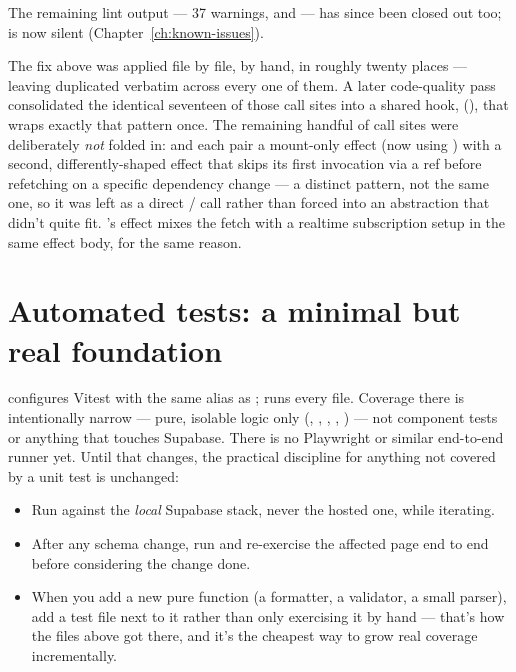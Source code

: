 \begin{olknote}
The remaining lint output — 37 warnings,  and  — has since been closed out too;  is now silent (Chapter~\ref{ch:known-issues}).
\end{olknote}

\begin{olknote}
The  fix above was applied file by file, by hand, in roughly twenty places — leaving  duplicated verbatim across every one of them. A later code-quality pass consolidated the identical seventeen of those call sites into a shared hook,  (), that wraps exactly that pattern once. The remaining handful of call sites were deliberately \emph{not} folded in:  and  each pair a mount-only effect (now using ) with a second, differently-shaped effect that skips its first invocation via a  ref before refetching on a specific dependency change — a distinct pattern, not the same one, so it was left as a direct / call rather than forced into an abstraction that didn't quite fit. 's effect mixes the fetch with a realtime subscription setup in the same effect body, for the same reason.
\end{olknote}

\section{Automated tests: a minimal but real foundation}

 configures Vitest with the same  alias as ;  runs every  file. Coverage there is intentionally narrow — pure, isolable logic only (, , , , ) — not component tests or anything that touches Supabase. There is no Playwright or similar end-to-end runner yet. Until that changes, the practical discipline for anything not covered by a unit test is unchanged:

\begin{itemize}
  \item Run  against the \emph{local} Supabase stack, never the hosted one, while iterating.
  \item After any schema change, run  and re-exercise the affected page end to end before considering the change done.
  \item When you add a new pure function (a formatter, a validator, a small parser), add a test file next to it rather than only exercising it by hand — that's how the files above got there, and it's the cheapest way to grow real coverage incrementally.
\end{itemize}

